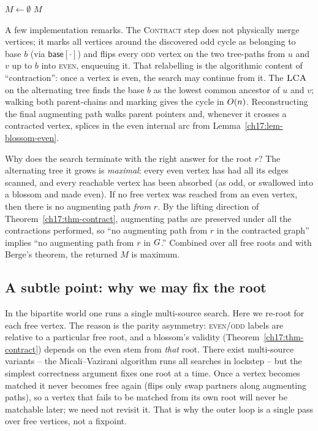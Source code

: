 \begin{algorithm}[H]
\caption{\textsc{MaximumMatching}$(\Gph)$ -- Edmonds' outer loop}
\label{ch17:alg-outer}
\DontPrintSemicolon
$M\gets\emptyset$ 
\Return $M$\;
\end{algorithm}

A few implementation remarks. The \textsc{Contract} step does not physically merge vertices; it marks
all vertices around the discovered odd cycle as belonging to base $b$ (via $\textsf{base}[\cdot]$) and
flips every \textsc{odd} vertex on the two tree-paths from $u$ and $v$ up to $b$ into \textsc{even},
enqueuing it. That relabelling is the algorithmic content of ``contraction'': once a vertex is even,
the search may continue from it. The $\textsc{LCA}$ on the alternating tree finds the base $b$ as the
lowest common ancestor of $u$ and $v$; walking both parent-chains and marking gives the cycle in
$O(n)$. Reconstructing the final augmenting path walks parent pointers and, whenever it crosses a
contracted vertex, splices in the even internal arc from Lemma~\ref{ch17:lem-blossom-even}.

\begin{whybox}
Why does the search terminate with the right answer for the root $r$? The alternating tree it grows is
\emph{maximal}: every even vertex has had all its edges scanned, and every reachable vertex has been
absorbed (as odd, or swallowed into a blossom and made even). If no free vertex was reached from an
even vertex, then there is no augmenting path \emph{from $r$}. By the lifting direction of
Theorem~\ref{ch17:thm-contract}, augmenting paths are preserved under all the contractions performed,
so ``no augmenting path from $r$ in the contracted graph'' implies ``no augmenting path from $r$ in
$G$.'' Combined over all free roots and with Berge's theorem, the returned $M$ is maximum.
\end{whybox}

\subsection{A subtle point: why we may fix the root}

In the bipartite world one runs a single multi-source search. Here we re-root for each free vertex.
The reason is the parity asymmetry: \textsc{even}/\textsc{odd} labels are relative to a particular
free root, and a blossom's validity (Theorem~\ref{ch17:thm-contract}) depends on the even stem from
\emph{that} root. There exist multi-source variants -- the Micali--Vazirani algorithm runs
all searches in lockstep -- but the simplest correctness argument fixes one root at a time. Once a vertex
becomes matched it never becomes free again (flips only swap partners along augmenting paths), so a
vertex that fails to be matched from its own root will never be matchable later; we need not revisit
it. That is why the outer loop is a single pass over free vertices, not a fixpoint.

